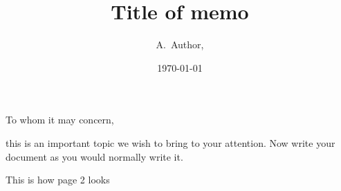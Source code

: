 \documentclass[DM,authoryear]{lsstdoc}
\title[Short title]{Title of memo}
\author{
A.~Author,
}
\date{\today}
\begin{document}
\mkmemotitle

To whom it may concern,

this is an important topic we wish to bring to your attention.
Now write your document as you would normally write it.
\restoregeometry
\newpage

This is how page 2 looks
\end{document}
